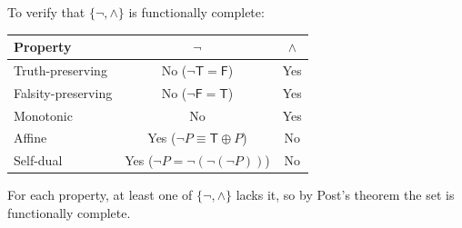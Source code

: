 \begin{example}
To verify that $\{\neg, \wedge\}$ is functionally complete:

\begin{center}
\renewcommand{\arraystretch}{1.3}
\begin{tabular}{|l|c|c|}
\hline
\textbf{Property} & $\neg$ & $\wedge$ \\
\hline
Truth-preserving & No ($\neg\mathsf{T} = \mathsf{F}$) & Yes \\
Falsity-preserving & No ($\neg\mathsf{F} = \mathsf{T}$) & Yes \\
Monotonic & No & Yes \\
Affine & Yes ($\neg P \equiv \mathsf{T} \oplus P$) & No \\
Self-dual & Yes ($\neg P = \neg(\neg(\neg P))$) & No \\
\hline
\end{tabular}
\end{center}

For each property, at least one of $\{\neg, \wedge\}$ lacks it, so by Post's
theorem the set is functionally complete.
\end{example}

